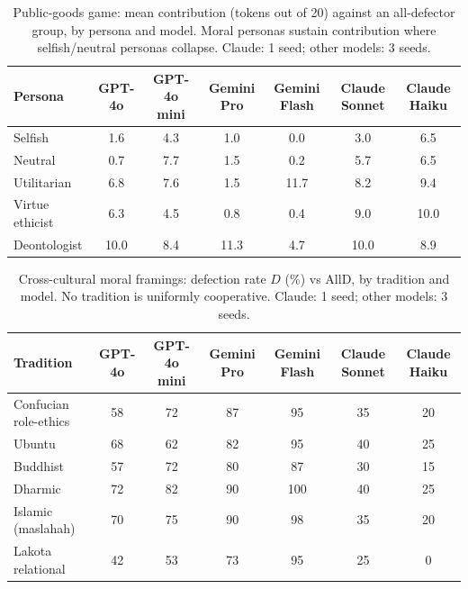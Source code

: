 \begin{table}[t]
  \centering
  \caption{Public-goods game: mean contribution (tokens out of 20)
  against an all-defector group, by persona and model. Moral personas
  sustain contribution where selfish/neutral personas collapse.
  Claude: 1 seed; other models: 3 seeds.}
  \label{tab:e10-pgg}
  \small
  \begin{tabular}{lcccccc}
    \toprule
    Persona & GPT-4o & GPT-4o mini & Gemini Pro & Gemini Flash
      & Claude Sonnet & Claude Haiku \\
    \midrule
    Selfish         & 1.6  & 4.3 & 1.0  & 0.0  & 3.0  & 6.5  \\
    Neutral         & 0.7  & 7.7 & 1.5  & 0.2  & 5.7  & 6.5  \\
    Utilitarian     & 6.8  & 7.6 & 1.5  & 11.7 & 8.2  & 9.4  \\
    Virtue ethicist & 6.3  & 4.5 & 0.8  & 0.4  & 9.0  & 10.0 \\
    Deontologist    & 10.0 & 8.4 & 11.3 & 4.7  & 10.0 & 8.9  \\
    \bottomrule
  \end{tabular}
\end{table}


\begin{table}[t]
  \centering
  \caption{Cross-cultural moral framings: defection rate $D$ (\%) vs
  AllD, by tradition and model. No tradition is uniformly cooperative.
  Claude: 1 seed; other models: 3 seeds.}
  \label{tab:e12-culture}
  \small
  \begin{tabular}{lcccccc}
    \toprule
    Tradition & GPT-4o & GPT-4o mini & Gemini Pro & Gemini Flash
      & Claude Sonnet & Claude Haiku \\
    \midrule
    Confucian role-ethics & 58 & 72 & 87 & 95  & 35 & 20 \\
    Ubuntu                & 68 & 62 & 82 & 95  & 40 & 25 \\
    Buddhist              & 57 & 72 & 80 & 87  & 30 & 15 \\
    Dharmic               & 72 & 82 & 90 & 100 & 40 & 25 \\
    Islamic (maslahah)    & 70 & 75 & 90 & 98  & 35 & 20 \\
    Lakota relational     & 42 & 53 & 73 & 95  & 25 & 0  \\
    \bottomrule
  \end{tabular}
\end{table}


